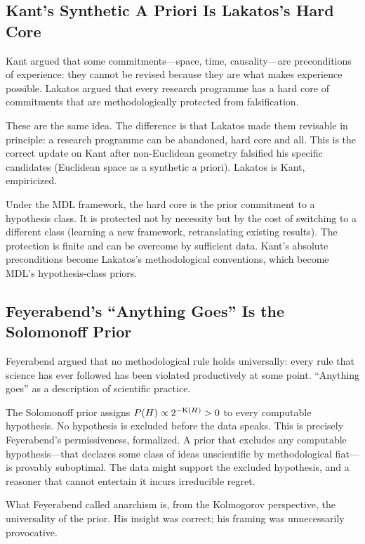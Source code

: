 \subsection{Kant's Synthetic A Priori Is Lakatos's Hard Core}

Kant argued that some commitments---space, time, causality---are
preconditions of experience: they cannot be revised because they are what
makes experience possible. Lakatos argued that every research programme has
a hard core of commitments that are methodologically protected from
falsification.

These are the same idea. The difference is that Lakatos made them revisable
in principle: a research programme can be abandoned, hard core and all.
This is the correct update on Kant after non-Euclidean geometry falsified
his specific candidates (Euclidean space as a synthetic a priori). Lakatos
is Kant, empiricized.

Under the MDL framework, the hard core is the prior commitment to a
hypothesis class. It is protected not by necessity but by the cost of
switching to a different class (learning a new framework, retranslating
existing results). The protection is finite and can be overcome by sufficient
data. Kant's absolute preconditions become Lakatos's methodological
conventions, which become MDL's hypothesis-class priors.

\subsection{Feyerabend's ``Anything Goes'' Is the Solomonoff Prior}

Feyerabend argued that no methodological rule holds universally: every rule
that science has ever followed has been violated productively at some point.
``Anything goes'' as a description of scientific practice.

The Solomonoff prior assigns $P(H) \propto 2^{-\mathrm{K}(H)} > 0$ to every
computable hypothesis. No hypothesis is excluded before the data speaks.
This is precisely Feyerabend's permissiveness, formalized. A prior that
excludes any computable hypothesis---that declares some class of ideas
unscientific by methodological fiat---is provably suboptimal. The data
might support the excluded hypothesis, and a reasoner that cannot entertain
it incurs irreducible regret.

What Feyerabend called anarchism is, from the Kolmogorov perspective, the
universality of the prior. His insight was correct; his framing was
unnecessarily provocative.

